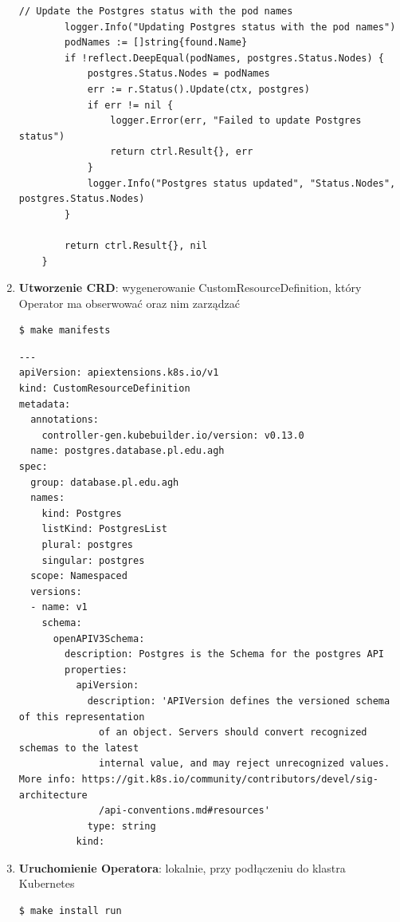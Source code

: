 \documentclass[polish]{aghengthesis}
\begin{document}
\begin{enumerate}
\begin{lstlisting}[caption=fragment kontrolera dla PostgreSQL]
    	// Update the Postgres status with the pod names
    	logger.Info("Updating Postgres status with the pod names")
    	podNames := []string{found.Name}
    	if !reflect.DeepEqual(podNames, postgres.Status.Nodes) {
    		postgres.Status.Nodes = podNames
    		err := r.Status().Update(ctx, postgres)
    		if err != nil {
    			logger.Error(err, "Failed to update Postgres status")
    			return ctrl.Result{}, err
    		}
    		logger.Info("Postgres status updated", "Status.Nodes", postgres.Status.Nodes)
    	}
    
    	return ctrl.Result{}, nil
    }
\end{lstlisting}


\item \textbf{Utworzenie CRD}: wygenerowanie CustomResourceDefinition, który Operator ma obserwować oraz nim zarządzać
\begin{lstlisting}[basicstyle=\ttfamily, numbers=none]
$ make manifests\end{lstlisting}

\begin{lstlisting}[caption=Fragment CRD dla PostgreSQL]
---
apiVersion: apiextensions.k8s.io/v1
kind: CustomResourceDefinition
metadata:
  annotations:
    controller-gen.kubebuilder.io/version: v0.13.0
  name: postgres.database.pl.edu.agh
spec:
  group: database.pl.edu.agh
  names:
    kind: Postgres
    listKind: PostgresList
    plural: postgres
    singular: postgres
  scope: Namespaced
  versions:
  - name: v1
    schema:
      openAPIV3Schema:
        description: Postgres is the Schema for the postgres API
        properties:
          apiVersion:
            description: 'APIVersion defines the versioned schema of this representation
              of an object. Servers should convert recognized schemas to the latest
              internal value, and may reject unrecognized values. More info: https://git.k8s.io/community/contributors/devel/sig-architecture
              /api-conventions.md#resources'
            type: string
          kind:
\end{lstlisting}

\item \textbf{Uruchomienie Operatora}: lokalnie, przy podłączeniu do klastra Kubernetes
\begin{lstlisting}[basicstyle=\ttfamily, numbers=none]
$ make install run\end{lstlisting}

    
\end{enumerate}
\end{document}
